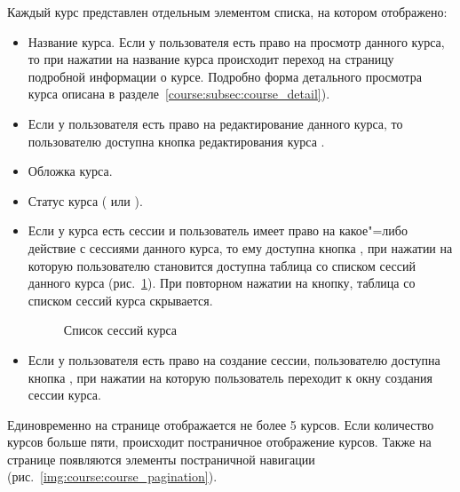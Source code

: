 Каждый курс представлен отдельным элементом списка, на котором отображено:
\begin{itemize}
	\item Название курса. Если у пользователя есть право на просмотр данного курса, то при нажатии на название курса происходит переход на страницу подробной информации о курсе. Подробно форма детального просмотра курса описана в разделе~\ref{course:subsec:course_detail}).
	\item Если у пользователя есть право на редактирование данного курса, то пользователю доступна кнопка редактирования курса .
	\item Обложка курса.
	\item Статус курса ( или ).
	\item Если у курса есть сессии и пользователь имеет право на какое"=либо действие с сессиями данного курса, то ему доступна кнопка , при нажатии на которую пользователю становится доступна таблица со списком сессий данного курса (рис.~\ref{img:course:course_session_list}). При повторном нажатии на кнопку, таблица со списком сессий курса скрывается.
	\begin{figure}[H]
		\caption{Список сессий курса}
		\label{img:course:course_session_list}
	\end{figure}
	
	\item Если у пользователя есть право на создание сессии, пользователю доступна кнопка , при нажатии на которую пользователь переходит к окну создания сессии курса.
\end{itemize}

Единовременно на странице отображается не более 5 курсов. Если количество курсов больше пяти, происходит постраничное отображение курсов. Также на странице появляются элементы постраничной навигации (рис.~\ref{img:course:course_pagination}).

